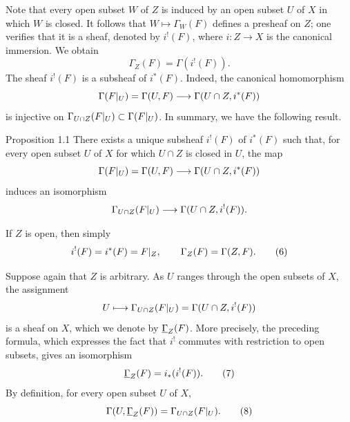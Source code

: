 Note that every open subset $W$ of $Z$ is induced by an open subset $U$
of $X$ in which $W$ is closed.  It follows that
$W\mapsto\Gamma_W(F)$ defines a presheaf on $Z$; one verifies that it is
a sheaf, denoted by $i^!(F)$, where $i:Z\to X$ is the canonical
immersion.  We obtain
\begin{equation}
  \Gamma_Z(F)=\Gamma(i^!(F)).
  \tag{5}\label{eq:I.5}
\end{equation}
The sheaf $i^!(F)$ is a subsheaf of $i^*(F)$.  Indeed, the canonical
homomorphism
\[
  \Gamma(F\vert_{U})=\Gamma(U,F)\longrightarrow
  \Gamma(U\cap Z,i^*(F))
\]
is injective on
$\Gamma_{U\cap Z}(F\vert_{U})\subset\Gamma(F\vert_{U})$.
In summary, we have the following result.

\begin{sgastatement}{Proposition 1.1}
There exists a unique subsheaf $i^!(F)$ of $i^*(F)$ such that, for every
open subset $U$ of $X$ for which $U\cap Z$ is closed in $U$, the map
\[
  \Gamma(F\vert_{U})=\Gamma(U,F)\longrightarrow
  \Gamma(U\cap Z,i^*(F))
\]
induces an isomorphism
\[
  \Gamma_{U\cap Z}(F\vert_{U})\longrightarrow
  \Gamma(U\cap Z,i^!(F)).
\]
\end{sgastatement}

If $Z$ is open, then simply
\begin{equation}
  i^!(F)=i^*(F)=F\vert_{Z},
  \qquad \Gamma_Z(F)=\Gamma(Z,F).
  \tag{6}\label{eq:I.6}
\end{equation}

Suppose again that $Z$ is arbitrary.  As $U$ ranges through the open
subsets of $X$, the assignment
\[
  U\longmapsto \Gamma_{U\cap Z}(F\vert_{U})
  =\Gamma(U\cap Z,i^!(F))
\]
is a sheaf on $X$, which we denote by $\mathop{\underline{\Gamma}}\nolimits_Z(F)$.  More precisely,
the preceding formula, which expresses the fact that $i^!$ commutes with
restriction to open subsets, gives an isomorphism
\begin{equation}
  \mathop{\underline{\Gamma}}\nolimits_Z(F)=i_*(i^!(F)).
  \tag{7}\label{eq:I.7}
\end{equation}
By definition, for every open subset $U$ of $X$,
\begin{equation}
  \Gamma(U,\mathop{\underline{\Gamma}}\nolimits_Z(F))
  =\Gamma_{U\cap Z}(F\vert_{U}).
  \tag{8}\label{eq:I.8}
\end{equation}

